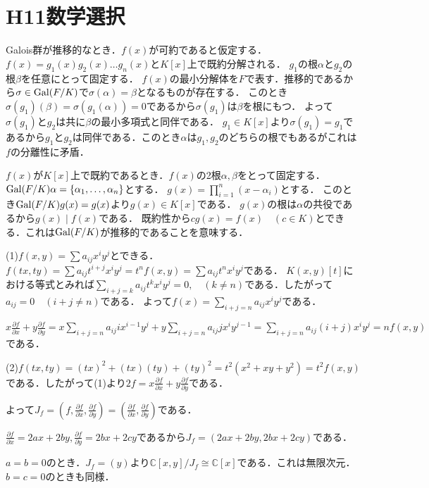 \documentclass[
		book,
		head_space=20mm,
		foot_space=20mm,
		gutter=10mm,
		line_length=190mm
]{jlreq}
\begin{document}
\section{H11数学選択}
Galois群が推移的なとき．$f(x)$が可約であると仮定する．$f(x)=g_1(x)g_2(x)\dots g_n(x)$と$K[x]$上で既約分解される．
$g_1$の根$\alpha$と$g_2$の根$\beta$を任意にとって固定する．
$f(x)$の最小分解体を$F$で表す．推移的であるから$\sigma \in \mathop{\mathrm{Gal}}(F/K)$で$\sigma(\alpha)=\beta$となるものが存在する．
このとき$\sigma(g_1)(\beta)=\sigma(g_1(\alpha))=0$であるから$\sigma(g_1)$は$\beta$を根にもつ．
よって$\sigma(g_1)$と$g_2$は共に$\beta$の最小多項式と同伴である．
$g_1 \in K[x]$より$\sigma(g_1) =g_1$であるから$g_1$と$g_2$は同伴である．このとき$\alpha$は$g_1,g_2$のどちらの根でもあるがこれは$f$の分離性に矛盾．

$f(x)$が$K[x]$上で既約であるとき．$f(x)$の2根$\alpha,\beta$をとって固定する．$\mathop{\mathrm{Gal}}(F/K)\alpha=\{ \alpha_1,\dots,\alpha_n\}$とする．
$g(x)=\prod_{i=1}^n (x-\alpha_i)$とする．
このとき$\mathop{\mathrm{Gal}}(F/K)g(x)=g(x)$より$g(x)\in K[x]$である．
$g(x)$の根は$\alpha$の共役であるから$g(x)\mid f(x)$である．
既約性から$cg(x)=f(x)\quad (c\in K)$とできる．これは$\mathop{\mathrm{Gal}}(F/K)$が推移的であることを意味する．

(1)$f(x,y)=\sum a_{ij}x^iy^j$とできる．
$f(tx,ty)=\sum a_{ij}t^{i+j}x^iy^j=t^nf(x,y)=\sum a_{ij}t^n x^iy^j$である．
$K(x,y)[t]$における等式とみれば$\sum_{i+j=k} a_{ij}t^k x^iy^j=0,\quad (k\neq n)$である．したがって$a_{ij}=0\quad(i+j\neq n)$である．
よって$f(x)=\sum\limits_{i+j=n} a_{ij}x^iy^j$である．

$x \frac{\partial f}{\partial x} + y \frac{\partial f}{\partial y} = x\sum\limits_{i+j=n} a_{ij}ix^{i-1}y^j + y\sum\limits_{i+j=n} a_{ij}jx^iy^{j-1}=\sum\limits_{i+j=n} a_{ij}(i+j) x^iy^j=nf(x,y)$である．

(2)$f(tx,ty)=(tx)^2+(tx)(ty)+(ty)^2=t^2(x^2+xy+y^2)=t^2f(x,y)$である．したがって(1)より$2f=x \frac{\partial f}{\partial x}+y \frac{\partial f}{\partial y}$である．

よって$J_f=(f,\frac{\partial f}{\partial x},\frac{\partial f}{\partial y})=(\frac{\partial f}{\partial x},\frac{\partial f}{\partial y})$である．

$\frac{\partial f}{\partial x}=2ax+2by, \frac{\partial f}{\partial y}=2bx+2cy$であるから$J_f=(2ax+2by,2bx+2cy)$である．

$a=b=0$のとき．$J_f=(y)$より$\mathbb{C}[x,y]/J_f \cong \mathbb{C}[x]$である．これは無限次元．
$b=c=0$のときも同様．
\end{document}
